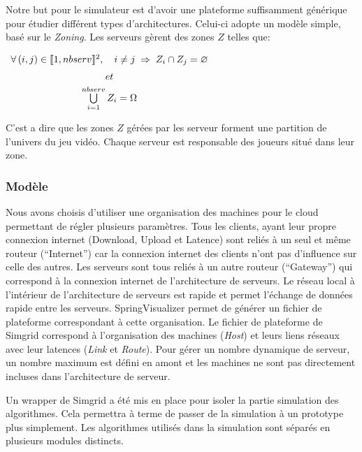 Notre but pour le simulateur est d'avoir une plateforme suffisamment générique pour étudier différent types d'architectures.
Celui-ci adopte un modèle simple, basé sur le \textit{Zoning}.
Les serveurs gèrent des zones $Z$ telles que:

\centering
$\begin{array}{cc}
\forall\,\mathopen{(}i,j\mathclose{)}\in \llbracket 1,nbserv \rrbracket ^{2},\quad i \neq j \;\Rightarrow\; Z_{i} \cap Z_{j} = \varnothing \vspace{2mm}\\
et\vspace{1mm}&\\
\bigcup\limits_{i=1}^{nbserv} Z_{i} = \Omega
\end{array}$

\justifying
C'est a dire que les zones $Z$ gérées par les serveur forment une partition de l'univers du jeu vidéo.
Chaque serveur est responsable des joueurs situé dans leur zone.

\subsubsection{Modèle}

Nous avons choisis d'utiliser une organisation des machines pour le cloud permettant de régler plusieurs paramètres.
Tous les clients, ayant leur propre connexion internet (Download, Upload et Latence) sont reliés à un seul et même routeur (``Internet'') car la connexion internet des clients n'ont pas d'influence sur celle des autres.
Les serveurs sont tous reliés à un autre routeur (``Gateway'') qui correspond à la connexion internet de l'architecture de serveurs.
Le réseau local à l'intérieur de l'architecture de serveurs est rapide et permet l'échange de données rapide entre les serveurs.
SpringVisualizer permet de générer un fichier de plateforme correspondant à cette organisation.
Le fichier de plateforme de Simgrid correspond à l'organisation des machines (\textit{Host}) et leurs liens réseaux avec leur latences (\textit{Link} et \textit{Route}).
Pour gérer un nombre dynamique de serveur, un nombre maximum est défini en amont et les machines ne sont pas directement incluses dans l'architecture de serveur.

Un wrapper de Simgrid a été mis en place pour isoler la partie simulation des algorithmes.
Cela permettra à terme de passer de la simulation à un prototype plus simplement.
Les algorithmes utilisés dans la simulation sont séparés en plusieurs modules distincts.

